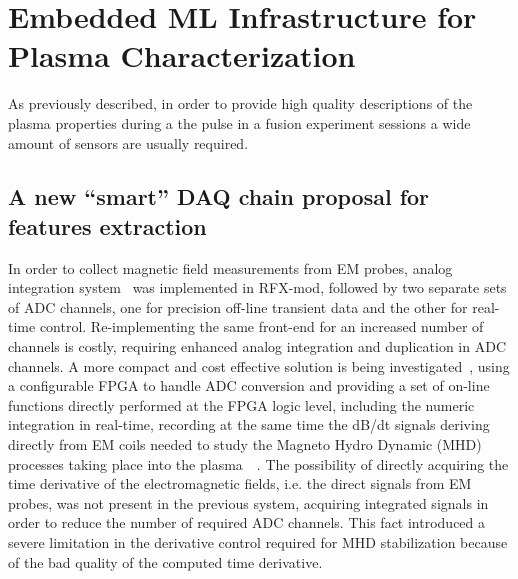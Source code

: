 
\chapter{Embedded ML Infrastructure for Plasma Characterization}

As previously described, in order to provide high quality descriptions of the plasma properties during a the pulse in a fusion experiment sessions a wide amount of sensors are usually required. 



\section{A new “smart” DAQ chain proposal for features extraction}

In order to collect magnetic field measurements from EM probes, analog integration system~\cite{pomaro2005transducers} was implemented in RFX-mod, followed by two separate sets of ADC channels, one for precision off-line transient data and the other for real-time control. Re-implementing the same front-end for an increased number of channels is costly, requiring enhanced analog integration and duplication in ADC channels.  A more compact and cost effective solution is being investigated~\cite{gottardo18}, using a configurable FPGA to handle ADC conversion and providing a set of on-line functions directly performed at the FPGA logic level, including the numeric integration in real-time, recording at the same time the dB/dt signals deriving directly from EM coils needed to study the Magneto Hydro Dynamic (MHD) processes taking place into the plasma~\cite{zuin2009current}~\cite{innocente2014tearing}. The possibility of directly acquiring the time derivative of the electromagnetic fields, i.e. the direct signals from EM probes, was not present in the previous system, acquiring integrated signals in order to reduce the number of required ADC channels. This fact introduced a severe limitation in the derivative control required for MHD stabilization because of the bad quality of the computed time derivative.

